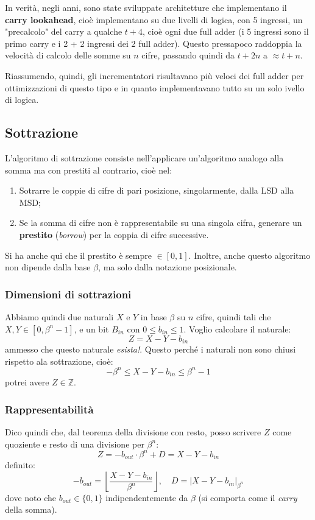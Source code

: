 \documentclass[a4paper,11pt]{article}
\begin{document}
In verità, negli anni, sono state sviluppate architetture che implementano il \textbf{carry lookahead}, cioè implementano su due livelli di logica, con 5 ingressi, un "precalcolo" del carry a qualche $t + 4$, cioè ogni due full adder (i 5 ingressi sono il primo carry e i 2 + 2 ingressi dei 2 full adder).
Questo pressapoco raddoppia la velocità di calcolo delle somme su $n$ cifre, passando quindi da $t + 2n$ a $\approx t + n$.

Riassumendo, quindi, gli incrementatori risultavano più veloci dei full adder per ottimizzazioni di questo tipo e in quanto implementavano tutto su un solo ivello di logica.

\subsection{Sottrazione}
L'algoritmo di sottrazione consiste nell'applicare un'algoritmo analogo alla somma ma con prestiti al contrario, cioè nel:
\begin{enumerate}
	\item Sotrarre le coppie di cifre di pari posizione, singolarmente, dalla LSD alla MSD;
	\item Se la somma di cifre non è rappresentabile su una singola cifra, generare un \textbf{prestito} (\textit{borrow}) per la coppia di cifre successive.
\end{enumerate}

Si ha anche qui che il prestito è sempre $\in [0, 1]$.
Inoltre, anche questo algoritmo non dipende dalla base $\beta$, ma solo dalla notazione posizionale.

\subsubsection{Dimensioni di sottrazioni}
Abbiamo quindi due naturali $X$ e $Y$ in base $\beta$ su $n$ cifre, quindi tali che $X, Y \in [0, \beta^n - 1]$, e un bit $B_{in}$ con $0 \leq b_{in} \leq 1$.
Voglio calcolare il naturale:
$$
Z = X - Y - b_{in}
$$
ammesso che questo naturale \textit{esista!}.
Questo perché i naturali non sono chiusi rispetto ala sottrazione, cioè:
$$ - \beta^n \leq X-Y-b_{in} \leq \beta^n -1$$
potrei avere $Z \in \mathbb{Z}$.

\subsubsection{Rappresentabilità}
Dico quindi che, dal teorema della divisione con resto, posso scrivere $Z$ come quoziente e resto di una divisione per $\beta^n$:
$$ Z = -b_{out} \cdot \beta^n + D = X - Y - b_{in} $$
definito:
$$
-b_{out} = \left\lfloor \frac{X-Y-b_{in}}{\beta^n} \right\rfloor, \quad D = |X-Y-b_{in}|_{\beta^n}
$$
dove noto che $b_{out} \in \{0 ,1\}$ indipendentemente da $\beta$ (si comporta come il \textit{carry} della somma). 
\end{document}
